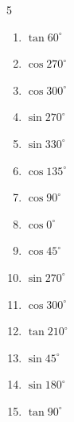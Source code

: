 \begin{multicols}{5}
\begin{enumerate}
\columnbreak %

  \item $\displaystyle \tan{60^\circ}$


  \item $\displaystyle \cos{270^\circ}$

        \phantom{$\displaystyle =0$}

  \item $\displaystyle \cos{300^\circ}$


  \item $\displaystyle \sin{270^\circ}$

        \phantom{$\displaystyle =-1$}

  \item $\displaystyle \sin{330^\circ}$


  \item $\displaystyle \cos{135^\circ}$


  \item $\displaystyle \cos{90^\circ}$

        \phantom{$\displaystyle =0$}

  \item $\displaystyle \cos{0^\circ}$

        \phantom{$\displaystyle =1$}

  \item $\displaystyle \cos{45^\circ}$


  \item $\displaystyle \sin{270^\circ}$

        \phantom{$\displaystyle =-1$}

  \item $\displaystyle \cos{300^\circ}$


  \item $\displaystyle \tan{210^\circ}$


  \item $\displaystyle \sin{45^\circ}$


  \item $\displaystyle \sin{180^\circ}$

        \phantom{$\displaystyle =0$}

  \item $\displaystyle \tan{90^\circ}$

        \phantom{$\displaystyle なし$}

\end{enumerate}
\end{multicols}


